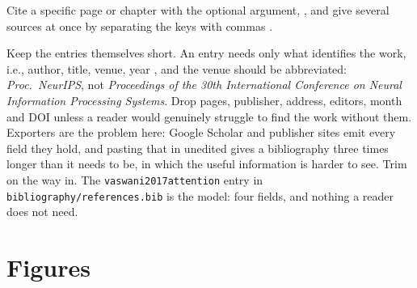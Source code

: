 Cite a specific page or chapter with the optional argument,
\parencite[p.~42]{example2020}, and give several sources at once by separating
the keys with commas \parencite{example2020,example2021}.

Keep the entries themselves short. An entry needs only what identifies the work, i.e.,
author, title, venue, year , and the venue should be abbreviated:
\emph{Proc.\ NeurIPS}, not \emph{Proceedings of the 30th International
Conference on Neural Information Processing Systems}. Drop pages, publisher,
address, editors, month and DOI unless a reader would genuinely struggle to
find the work without them. Exporters are the problem here: Google Scholar and
publisher sites emit every field they hold, and pasting that in unedited gives
a bibliography three times longer than it needs to be, in which the useful
information is harder to see. Trim on the way in. The
\texttt{vaswani2017attention} \parencite{vaswani2017attention} entry in \texttt{bibliography/references.bib} is
the model: four fields, and nothing a reader does not need.

\section{Figures}
\label{sec:figures}

%
%
%
%
%


